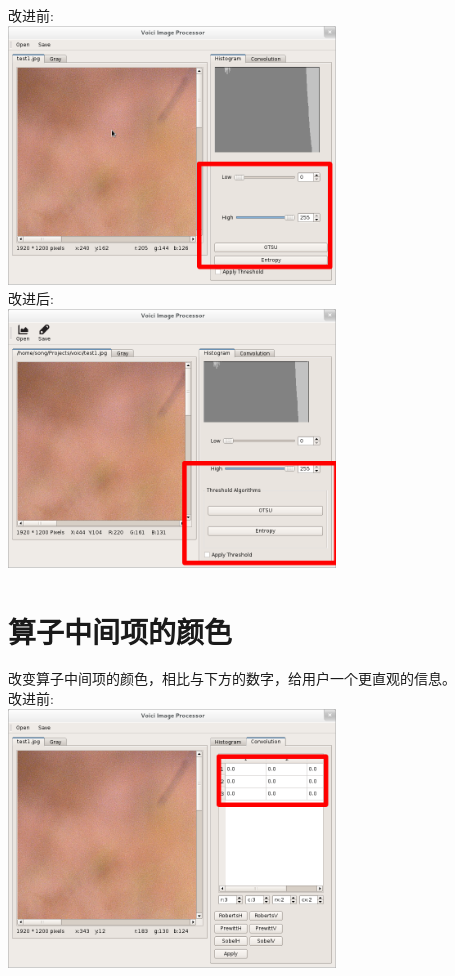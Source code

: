 \documentclass[10pt,a4paper]{article}
\begin{document}
改进前:\\
\indent\includegraphics[width=0.65\textwidth]{group_origin.png}\\

改进后:\\
\indent\includegraphics[width=0.65\textwidth]{group_improved.png}

\pagebreak

\section{算子中间项的颜色}
改变算子中间项的颜色，相比与下方的数字，给用户一个更直观的信息。\\

改进前:\\
\indent\includegraphics[width=0.65\textwidth]{item_origin.png}\\
\end{document}
